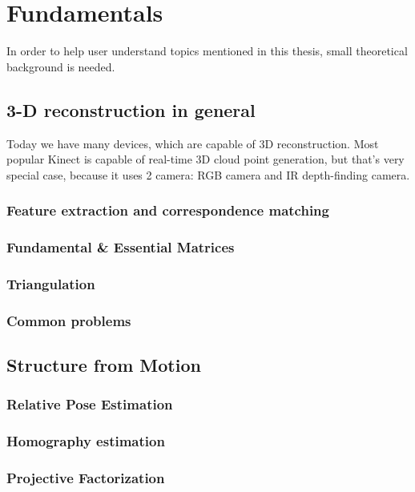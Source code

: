 
\chapter{Fundamentals} %
In order to help user understand topics mentioned in this thesis, small theoretical background is needed.


\section{3-D reconstruction in general}
Today we have many devices, which are capable of 3D reconstruction. Most popular Kinect\cite{kinect} is capable of real-time 3D cloud point generation, but that's very special case, because it uses 2 camera: RGB camera and IR depth-finding camera. 

\subsection{Feature extraction and correspondence matching}
\subsection{Fundamental \& Essential Matrices}
\subsection{Triangulation}
\subsection{Common problems}

\section{Structure from Motion}
\subsection{Relative Pose Estimation}
\subsection{Homography estimation}
\subsection{Projective Factorization}
